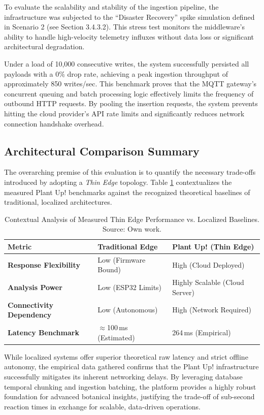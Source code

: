 To evaluate the scalability and stability of the ingestion pipeline, the infrastructure was subjected to the ``Disaster Recovery'' spike simulation defined in Scenario 2 (see Section 3.4.3.2). This stress test monitors the middleware's ability to handle high-velocity telemetry influxes without data loss or significant architectural degradation.

Under a load of 10,000 consecutive writes, the system successfully persisted all payloads with a 0\% drop rate, achieving a peak ingestion throughput of approximately 850 writes/sec. This benchmark proves that the MQTT gateway's concurrent queuing and batch processing logic effectively limits the frequency of outbound HTTP requests. By pooling the insertion requests, the system prevents hitting the cloud provider's API rate limits and significantly reduces network connection handshake overhead.

\newpage
\subsection{Architectural Comparison Summary}

The overarching premise of this evaluation is to quantify the necessary trade-offs introduced by adopting a \textit{Thin Edge} topology. Table \ref{tab:architecture_comparison} contextualizes the measured Plant Up! benchmarks against the recognized theoretical baselines of traditional, localized architectures.

\begin{table}[htbp]
    \centering
    \renewcommand{\arraystretch}{1.4}
    \begin{tabular}{@{} l l l @{}}
        \toprule
        \textbf{Metric} & \textbf{Traditional Edge} & \textbf{Plant Up! (Thin Edge)} \\ \midrule
        \textbf{Response Flexibility} & Low (Firmware Bound) & High (Cloud Deployed) \\
        \textbf{Analysis Power} & Low (ESP32 Limits) & Highly Scalable (Cloud Server) \\
        \textbf{Connectivity Dependency} & Low (Autonomous) & High (Network Required) \\
        \textbf{Latency Benchmark} & $\approx$100\,ms (Estimated) & 264\,ms (Empirical) \\ \bottomrule
    \end{tabular}
    \caption{Contextual Analysis of Measured Thin Edge Performance vs. Localized Baselines. Source: Own work.}
    \label{tab:architecture_comparison}
\end{table}

While localized systems offer superior theoretical raw latency and strict offline autonomy, the empirical data gathered confirms that the Plant Up! infrastructure successfully mitigates its inherent networking delays. By leveraging database temporal chunking and ingestion batching, the platform provides a highly robust foundation for advanced botanical insights, justifying the trade-off of sub-second reaction times in exchange for scalable, data-driven operations.

